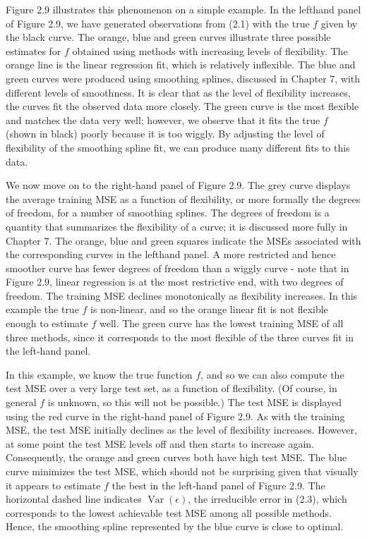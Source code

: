 \documentclass[10pt]{article}
\begin{document}
Figure 2.9 illustrates this phenomenon on a simple example. In the lefthand panel of Figure 2.9, we have generated observations from (2.1) with the true $f$ given by the black curve. The orange, blue and green curves illustrate three possible estimates for $f$ obtained using methods with increasing levels of flexibility. The orange line is the linear regression fit, which is relatively inflexible. The blue and green curves were produced using smoothing splines, discussed in Chapter 7, with different levels of smoothness. It is clear that as the level of flexibility increases, the curves fit the observed data more closely. The green curve is the most flexible and matches the data very well; however, we observe that it fits the true $f$ (shown in black) poorly because it is too wiggly. By adjusting the level of flexibility of the smoothing spline fit, we can produce many different fits to this data.

We now move on to the right-hand panel of Figure 2.9. The grey curve displays the average training MSE as a function of flexibility, or more formally the degrees of freedom, for a number of smoothing splines. The degrees of freedom is a quantity that summarizes the flexibility of a curve; it is discussed more fully in Chapter 7. The orange, blue and green squares indicate the MSEs associated with the corresponding curves in the lefthand panel. A more restricted and hence smoother curve has fewer degrees of freedom than a wiggly curve - note that in Figure 2.9, linear regression is at the most restrictive end, with two degrees of freedom. The training MSE declines monotonically as flexibility increases. In this example the true $f$ is non-linear, and so the orange linear fit is not flexible enough to estimate $f$ well. The green curve has the lowest training MSE of all three methods, since it corresponds to the most flexible of the three curves fit in the left-hand panel.

In this example, we know the true function $f$, and so we can also compute the test MSE over a very large test set, as a function of flexibility. (Of course, in general $f$ is unknown, so this will not be possible.) The test MSE is displayed using the red curve in the right-hand panel of Figure 2.9. As with the training MSE, the test MSE initially declines as the level of flexibility increases. However, at some point the test MSE levels off and then starts to increase again. Consequently, the orange and green curves both have high test MSE. The blue curve minimizes the test MSE, which should not be surprising given that visually it appears to estimate $f$ the best in the left-hand panel of Figure 2.9. The horizontal dashed line indicates $\operatorname{Var}(\epsilon)$, the irreducible error in (2.3), which corresponds to the lowest achievable test MSE among all possible methods. Hence, the smoothing spline represented by the blue curve is close to optimal.
\end{document}
